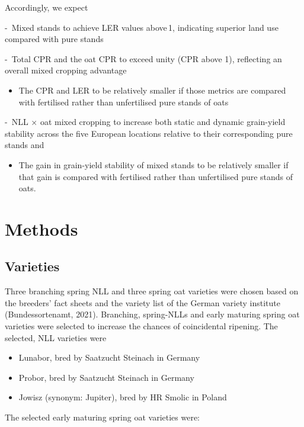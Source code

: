 \documentclass[
  british,
  a4paper,
  DIV=11,
  numbers=noendperiod]{scrreprt}
\providecommand{\tightlist}{%
  \setlength{\itemsep}{0pt}\setlength{\parskip}{0pt}}
\begin{document}
Accordingly, we expect

- Mixed stands to achieve LER values above\,1, indicating superior land
use compared with pure stands

- Total CPR and the oat CPR to exceed unity (CPR above 1), reflecting an
overall mixed cropping advantage

\begin{itemize}
\tightlist
\item
  The CPR and LER to be relatively smaller if those metrics are compared
  with fertilised rather than unfertilised pure stands of oats
\end{itemize}

- NLL × oat mixed cropping to increase both static and dynamic
grain-yield stability across the five European locations relative to
their corresponding pure stands and

\begin{itemize}
\tightlist
\item
  The gain in grain-yield stability of mixed stands to be relatively
  smaller if that gain is compared with fertilised rather than
  unfertilised pure stands of oats.
\end{itemize}

\chapter{Methods}\label{methods}

\section{Varieties}\label{varieties}

Three branching spring NLL and three spring oat varieties were chosen
based on the breeders' fact sheets and the variety list of the German
variety institute (Bundessortenamt, 2021). Branching, spring-NLLs and
early maturing spring oat varieties were selected to increase the
chances of coincidental ripening. The selected, NLL varieties were

\begin{itemize}
\tightlist
\item
  Lunabor, bred by Saatzucht Steinach in Germany
\item
  Probor, bred by Saatzucht Steinach in Germany
\item
  Jowisz (synonym: Jupiter), bred by HR Smolic in Poland
\end{itemize}

The selected early maturing spring oat varieties were:
\end{document}
